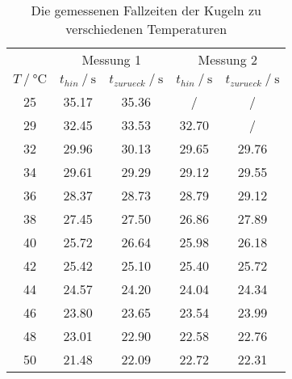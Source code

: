 \begin{table}
    \centering
    \caption{Die gemessenen Fallzeiten der Kugeln zu verschiedenen Temperaturen}
    \begin{tabular}{ccccc}
      \toprule
      & \multicolumn{2}{c}{Messung 1} &\multicolumn{2}{c}{Messung 2} \\
      \cmidrule(lr){2-3} \cmidrule(lr){4-5}
      {$T \mathbin{/} \unit{\celsius}$} &
      {$t_{hin} \mathbin{/} \unit{\second}$} &
      {$t_{zurueck} \mathbin{/} \unit{\second}$} &
      {$t_{hin} \mathbin{/} \unit{\second}$} &
      {$t_{zurueck} \mathbin{/} \unit{\second}$} \\
      \midrule
      25 & 35.17 & 35.36 & /     & /     \\
      29 & 32.45 & 33.53 & 32.70 & /     \\
      32 & 29.96 & 30.13 & 29.65 & 29.76 \\
      34 & 29.61 & 29.29 & 29.12 & 29.55 \\
      36 & 28.37 & 28.73 & 28.79 & 29.12 \\
      38 & 27.45 & 27.50 & 26.86 & 27.89 \\
      40 & 25.72 & 26.64 & 25.98 & 26.18 \\
      42 & 25.42 & 25.10 & 25.40 & 25.72 \\
      44 & 24.57 & 24.20 & 24.04 & 24.34 \\
      46 & 23.80 & 23.65 & 23.54 & 23.99 \\
      48 & 23.01 & 22.90 & 22.58 & 22.76 \\
      50 & 21.48 & 22.09 & 22.72 & 22.31 \\
      \bottomrule
    \end{tabular}
    \label{tab:Tabelle2}
  \end{table}
